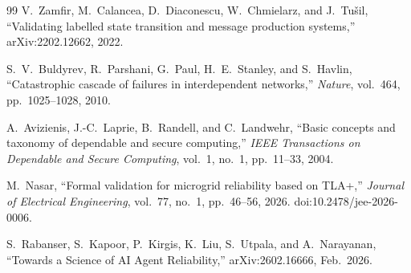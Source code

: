 \documentclass[10pt,twocolumn]{article}
\begin{document}
\begin{thebibliography}{99}
V.~Zamfir, M.~Calancea, D.~Diaconescu, W.~Chmielarz,
and J.~Tu\v{s}il,
``Validating labelled state transition and message production
systems,'' arXiv:2202.12662, 2022.

S.~V.~Buldyrev, R.~Parshani, G.~Paul, H.~E.~Stanley, and
S.~Havlin,
``Catastrophic cascade of failures in interdependent networks,''
\textit{Nature}, vol.~464, pp.~1025--1028, 2010.

A.~Avizienis, J.-C.~Laprie, B.~Randell, and C.~Landwehr,
``Basic concepts and taxonomy of dependable and secure computing,''
\textit{IEEE Transactions on Dependable and Secure Computing},
vol.~1, no.~1, pp.~11--33, 2004.

M.~Nasar,
``Formal validation for microgrid reliability based on TLA+,''
\textit{Journal of Electrical Engineering}, vol.~77, no.~1,
pp.~46--56, 2026. doi:10.2478/jee-2026-0006.

S.~Rabanser, S.~Kapoor, P.~Kirgis, K.~Liu, S.~Utpala,
and A.~Narayanan,
``Towards a Science of AI Agent Reliability,''
arXiv:2602.16666, Feb.~2026.

\end{thebibliography}
\end{document}

